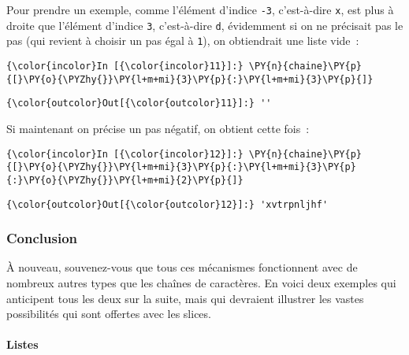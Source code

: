 Pour prendre un exemple, comme l'élément d'indice \texttt{-3},
c'est-à-dire \texttt{x}, est plus à droite que l'élément d'indice
\texttt{3}, c'est-à-dire \texttt{d}, évidemment si on ne précisait pas
le pas (qui revient à choisir un pas égal à \texttt{1}), on obtiendrait
une liste vide~:

    \begin{Verbatim}[commandchars=\\\{\},frame=single,framerule=0.3mm,rulecolor=\color{cellframecolor}]
{\color{incolor}In [{\color{incolor}11}]:} \PY{n}{chaine}\PY{p}{[}\PY{o}{\PYZhy{}}\PY{l+m+mi}{3}\PY{p}{:}\PY{l+m+mi}{3}\PY{p}{]}
\end{Verbatim}


\begin{Verbatim}[commandchars=\\\{\},frame=single,framerule=0.3mm,rulecolor=\color{cellframecolor}]
{\color{outcolor}Out[{\color{outcolor}11}]:} ''
\end{Verbatim}
            
    Si maintenant on précise un pas négatif, on obtient cette fois~:

    \begin{Verbatim}[commandchars=\\\{\},frame=single,framerule=0.3mm,rulecolor=\color{cellframecolor}]
{\color{incolor}In [{\color{incolor}12}]:} \PY{n}{chaine}\PY{p}{[}\PY{o}{\PYZhy{}}\PY{l+m+mi}{3}\PY{p}{:}\PY{l+m+mi}{3}\PY{p}{:}\PY{o}{\PYZhy{}}\PY{l+m+mi}{2}\PY{p}{]}
\end{Verbatim}


\begin{Verbatim}[commandchars=\\\{\},frame=single,framerule=0.3mm,rulecolor=\color{cellframecolor}]
{\color{outcolor}Out[{\color{outcolor}12}]:} 'xvtrpnljhf'
\end{Verbatim}
            
    \hypertarget{conclusion}{%
\subsubsection{Conclusion}\label{conclusion}}

    À nouveau, souvenez-vous que tous ces mécanismes fonctionnent avec de
nombreux autres types que les chaînes de caractères. En voici deux
exemples qui anticipent tous les deux sur la suite, mais qui devraient
illustrer les vastes possibilités qui sont offertes avec les slices.

    \hypertarget{listes}{%
\paragraph{Listes}\label{listes}}

